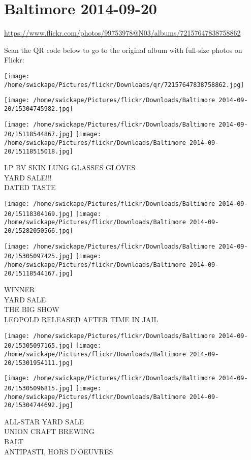 \documentclass[10pt,letterpaper]{article}
\title{}
\author{}
\date{}
\begin{document}
\section*{Baltimore 2014-09-20}

\url{https://www.flickr.com/photos/99753978@N03/albums/72157647838758862}

Scan the QR code below to go to the original album with full-size photos on Flickr:

\texttt{[image: /home/swickape/Pictures/flickr/Downloads/qr/72157647838758862.jpg]}
\pagebreak

\texttt{[image: /home/swickape/Pictures/flickr/Downloads/Baltimore 2014-09-20/15304745982.jpg]}

\vspace{0.25in}
\texttt{[image: /home/swickape/Pictures/flickr/Downloads/Baltimore 2014-09-20/15118544867.jpg]}
\texttt{[image: /home/swickape/Pictures/flickr/Downloads/Baltimore 2014-09-20/15118515018.jpg]}

LP BV SKIN LUNG GLASSES GLOVES\\
YARD SALE!!!\\
DATED TASTE
\pagebreak

\texttt{[image: /home/swickape/Pictures/flickr/Downloads/Baltimore 2014-09-20/15118304169.jpg]}
\texttt{[image: /home/swickape/Pictures/flickr/Downloads/Baltimore 2014-09-20/15282050566.jpg]}

\texttt{[image: /home/swickape/Pictures/flickr/Downloads/Baltimore 2014-09-20/15305097425.jpg]}
\texttt{[image: /home/swickape/Pictures/flickr/Downloads/Baltimore 2014-09-20/15118544167.jpg]}

WINNER\\
YARD SALE\\
THE BIG SHOW\\
LEOPOLD RELEASED AFTER TIME IN JAIL
\pagebreak

\texttt{[image: /home/swickape/Pictures/flickr/Downloads/Baltimore 2014-09-20/15305097165.jpg]}
\texttt{[image: /home/swickape/Pictures/flickr/Downloads/Baltimore 2014-09-20/15301954111.jpg]}

\texttt{[image: /home/swickape/Pictures/flickr/Downloads/Baltimore 2014-09-20/15305096815.jpg]}
\texttt{[image: /home/swickape/Pictures/flickr/Downloads/Baltimore 2014-09-20/15304744692.jpg]}

ALL{-}STAR YARD SALE\\
UNION CRAFT BREWING\\
BALT\\
ANTIPASTI, HORS D'OEUVRES
\pagebreak
\end{document}
